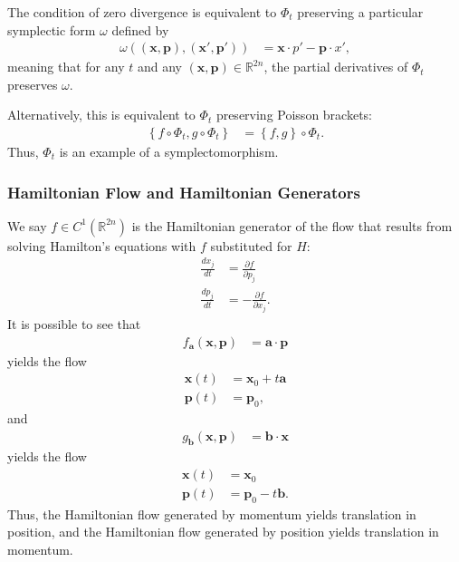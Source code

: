 \documentclass[12pt]{extarticle}
\newcommand{\R}{\mathbb{R}}
\newcommand{\set}[1]{\left\{#1\right\}}
\theoremstyle{plain}
\theoremstyle{definition}
\theoremstyle{remark}
\renewcommand{\newline}{\hfill\break}
\begin{document}
  The condition of zero divergence is equivalent to $\Phi_t$ preserving a particular symplectic form $\omega$ defined by
  \begin{align*}
    \omega\left((\mathbf{x},\mathbf{p}),(\mathbf{x}',\mathbf{p}')\right) &= \mathbf{x}\cdot p' - \mathbf{p}\cdot x',
  \end{align*}
  meaning that for any $t$ and any $(\mathbf{x},\mathbf{p})\in \R^{2n}$, the partial derivatives of $\Phi_t$ preserves $\omega$.\newline

  Alternatively, this is equivalent to $\Phi_t$ preserving Poisson brackets:
  \begin{align*}
    \set{f\circ \Phi_t,g\circ\Phi_t} &= \set{f,g}\circ \Phi_t.
  \end{align*}
  Thus, $\Phi_t$ is an example of a symplectomorphism.
  \subsubsection{Hamiltonian Flow and Hamiltonian Generators}%
  We say $f\in C^{1}(\R^{2n})$ is the Hamiltonian generator of the flow that results from solving Hamilton's equations with $f$ substituted for $H$:
  \begin{align*}
    \frac{dx_j}{dt} &= \frac{\partial f}{\partial p_j}\\
    \frac{dp_j}{dt} &= -\frac{\partial f}{\partial x_j}.
  \end{align*}
  It is possible to see that
  \begin{align*}
    f_{\mathbf{a}}(\mathbf{x},\mathbf{p}) &= \mathbf{a}\cdot \mathbf{p}
  \end{align*}
  yields the flow
  \begin{align*}
    \mathbf{x}(t) &= \mathbf{x}_0 + t\mathbf{a}\\
    \mathbf{p}(t) &= \mathbf{p}_0,
  \end{align*}
  and
  \begin{align*}
    g_{\mathbf{b}}(\mathbf{x},\mathbf{p}) &= \mathbf{b}\cdot \mathbf{x}
  \end{align*}
  yields the flow
  \begin{align*}
    \mathbf{x}(t) &= \mathbf{x}_0\\
    \mathbf{p}(t) &= \mathbf{p}_0 - t\mathbf{b}.
  \end{align*}
  Thus, the Hamiltonian flow generated by momentum yields translation in position, and the Hamiltonian flow generated by position yields translation in momentum.\newline
\end{document}
